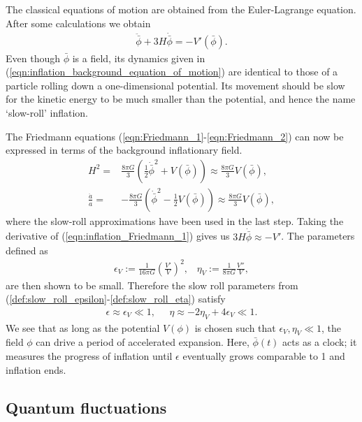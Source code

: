 The classical equations of motion are obtained from the Euler-Lagrange equation. After some calculations we obtain
\begin{align}
	\ddot{\bar{\phi}} + 3H\dot{\bar{\phi}} = - V'(\bar{\phi}). 	  \label{eqn:inflation_background_equation_of_motion}
\end{align}
Even though $\bar{\phi}$ is a field, its dynamics given in (\ref{eqn:inflation_background_equation_of_motion}) are identical to those of a particle rolling down a one-dimensional potential. Its movement should be slow for the kinetic energy to be much smaller than the potential, and hence the name `slow-roll' inflation.

The Friedmann equations (\ref{eqn:Friedmann_1}-\ref{eqn:Friedmann_2}) can now be expressed in terms of the background inflationary field.
\begin{align}
	H^2 =& \frac{8\pi G}{3} \left( \frac{1}{2} \dot{\bar{\phi}}^2 + V(\bar{\phi}) \right) \approx \frac{8\pi G}{3} V(\bar{\phi}), \label{eqn:inflation_Friedmann_1} \\
	\frac{\ddot{a}}{a} =& -\frac{8\pi G}{3} \left( \dot{\bar{\phi}}^2 - \frac{1}{2} V(\bar{\phi}) \right) \approx \frac{8\pi G}{3} V(\bar{\phi}), \label{eqn:inflation_Friedmann_2}
\end{align}
where the slow-roll approximations have been used in the last step. Taking the derivative of (\ref{eqn:inflation_Friedmann_1}) gives us $3H\dot{\bar{\phi}} \approx -V'$. The parameters defined as
\begin{align}
	\epsilon_V := \frac{1}{16\pi G} \left( \frac{V'}{V} \right)^2, \;\;\;
	\eta_V := \frac{1}{8\pi G} \frac{V''}{V},
\end{align}
are then shown to be small. Therefore the slow roll parameters from (\ref{def:slow_roll_epsilon}-\ref{def:slow_roll_eta}) satisfy
\begin{align}
	\epsilon \approx \epsilon_V \ll 1, \;\;\;\;\; \eta \approx -2\eta_V + 4\epsilon_V \ll 1.
\end{align}
We see that as long as the potential $V(\phi)$ is chosen such that $\epsilon_V, \eta_V \ll 1$, the field $\phi$ can drive a period of accelerated expansion. Here, $\bar{\phi}(t)$ acts as a clock; it measures the progress of inflation until $\epsilon$ eventually grows comparable to 1 and inflation ends.

\subsection{Quantum fluctuations} \label{section:quantum_fluctuations}

